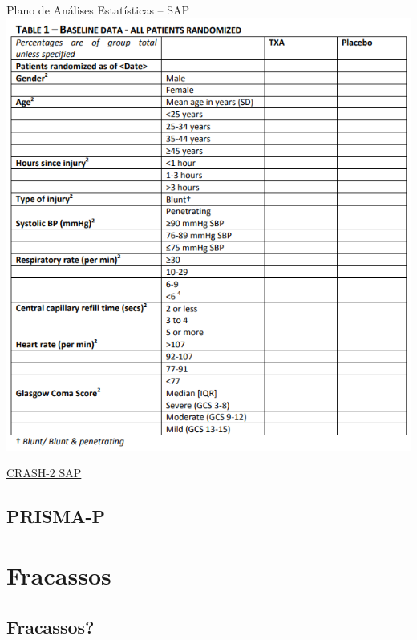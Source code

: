 \documentclass{beamer}
\begin{document}
\begin{frame}{Plano de Análises Estatísticas -- SAP}
  \centering
  \includegraphics[height=.9\textheight]{Etapas/CRASH-SAP2}

  \vfill
  \scriptsize
  \hfill \href{http://www.crash2.lshtm.ac.uk/Images/SAP.pdf}{CRASH-2 SAP}
\end{frame}

\subsection{PRISMA-P}

\section{Fracassos}

\subsection{Fracassos?}
\end{document}
